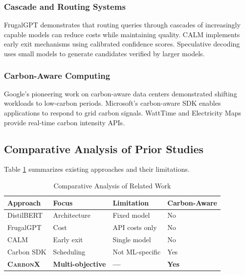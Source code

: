 \documentclass[conference]{IEEEtran}
\newcommand{\carbonx}{\textsc{CarbonX}}
\begin{document}
\subsubsection{Cascade and Routing Systems}

FrugalGPT \cite{chen2023frugalgpt} demonstrates that routing queries through cascades of increasingly capable models can reduce costs while maintaining quality. CALM \cite{schuster2022confident} implements early exit mechanisms using calibrated confidence scores. Speculative decoding \cite{leviathan2023fast} uses small models to generate candidates verified by larger models.

\subsubsection{Carbon-Aware Computing}

Google's pioneering work on carbon-aware data centers \cite{radovanovic2022carbon} demonstrated shifting workloads to low-carbon periods. Microsoft's carbon-aware SDK \cite{microsoft2023carbon} enables applications to respond to grid carbon signals. WattTime \cite{watttime2023} and Electricity Maps \cite{electricitymaps2023} provide real-time carbon intensity APIs.

\subsection{Comparative Analysis of Prior Studies}

Table \ref{tab:related_work} summarizes existing approaches and their limitations.

\begin{table}[h]
\centering
\caption{Comparative Analysis of Related Work}
\label{tab:related_work}
\begin{tabular}{p{1.5cm}p{2cm}p{2cm}p{1.5cm}}
\toprule
\textbf{Approach} & \textbf{Focus} & \textbf{Limitation} & \textbf{Carbon-Aware} \\
\midrule
DistilBERT & Architecture & Fixed model & No \\
FrugalGPT & Cost & API costs only & No \\
CALM & Early exit & Single model & No \\
Carbon SDK & Scheduling & Not ML-specific & Yes \\
\textbf{\carbonx{}} & \textbf{Multi-objective} & \textbf{—} & \textbf{Yes} \\
\bottomrule
\end{tabular}
\end{table}
\end{document}
